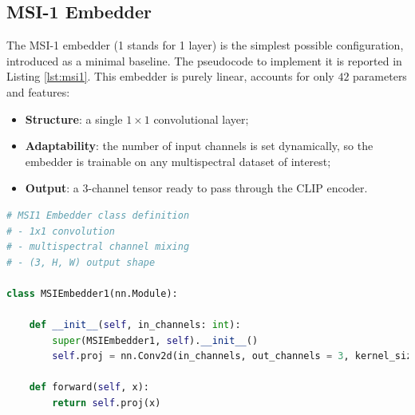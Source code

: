 \documentclass[a4paper, twoside, english]{sapthesis} %
\begin{document}

\subsection{MSI-1 Embedder}

The MSI-1 embedder (1 stands for 1 layer) is the simplest possible configuration, introduced as a minimal baseline. The pseudocode to implement it is reported in Listing \ref{lst:msi1}. This embedder is purely linear, accounts for only $42$ parameters and features:

\begin{itemize}
    \item \textbf{Structure}: a single $1\times1$ convolutional layer;
    \item \textbf{Adaptability}: the number of input channels is set dynamically, so the embedder is trainable on any multispectral dataset of interest;
    \item \textbf{Output}: a 3-channel tensor ready to pass through the CLIP encoder.
\end{itemize}


\begin{lstlisting}[language=Python, caption={MSI-1 Embedder implemented in Pytorch.}, label={lst:msi1}]
# MSI1 Embedder class definition
# - 1x1 convolution
# - multispectral channel mixing
# - (3, H, W) output shape

class MSIEmbedder1(nn.Module):

    def __init__(self, in_channels: int):
        super(MSIEmbedder1, self).__init__()
        self.proj = nn.Conv2d(in_channels, out_channels = 3, kernel_size = 1)

    def forward(self, x):
        return self.proj(x) 
\end{lstlisting}
\end{document}
